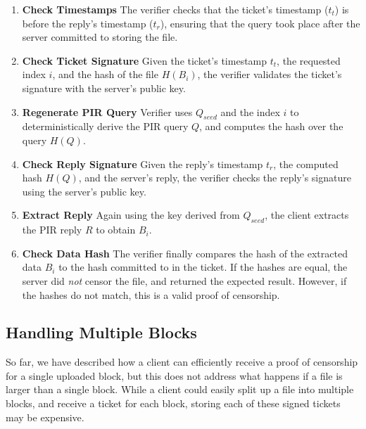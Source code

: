 \begin{enumerate}
\item \textbf{Check Timestamps} The verifier checks that the ticket's timestamp
        ($t_t$)
        is before the reply's timestamp ($t_r$), ensuring that the query took
        place after the server committed to storing the file.
\item \textbf{Check Ticket Signature} Given the ticket's timestamp $t_t$, the
        requested index $i$, and the hash of the file $H(B_i)$, the verifier
        validates the ticket's signature with the server's public key.
\item \textbf{Regenerate PIR Query} Verifier uses $Q_{seed}$ and the index $i$
        to deterministically derive the PIR query $Q$, and computes the hash
        over the query $H(Q)$.
\item \textbf{Check Reply Signature} Given the reply's timestamp $t_r$, the
        computed hash $H(Q)$, and the server's reply, the verifier checks the
        reply's signature using the server's public key.
\item \textbf{Extract Reply} Again using the key derived from $Q_{seed}$, the
        client extracts the PIR reply $R$ to obtain $B_i$.
\item \textbf{Check Data Hash} The verifier finally compares the hash of the
        extracted data $B_i$ to the hash committed to in the ticket. If the
        hashes are equal, the server did \emph{not} censor the file, and
        returned the expected result. However, if the hashes do not match, this
        is a valid proof of censorship.
\end{enumerate}



\subsection{Handling Multiple Blocks}
\label{sec:poc-multi-block}

So far, we have described how a client can efficiently receive a proof of
censorship for a single uploaded block, but this does not address what happens
if a file is larger than a single block. While a client could easily split up a
file into multiple blocks, and receive a ticket for each block, storing each of
these signed tickets may be expensive.

